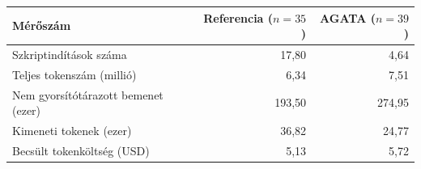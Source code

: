 \begin{tabular}{@{}lrr@{}}
\toprule
Mérőszám & Referencia ($n=35$) & AGATA ($n=39$) \\
\midrule
Szkriptindítások száma & 17,80 & 4,64 \\
Teljes tokenszám (millió) & 6,34 & 7,51 \\
Nem gyorsítótárazott bemenet (ezer) & 193,50 & 274,95 \\
Kimeneti tokenek (ezer) & 36,82 & 24,77 \\
Becsült tokenköltség (USD) & 5,13 & 5,72 \\
\bottomrule
\end{tabular}
